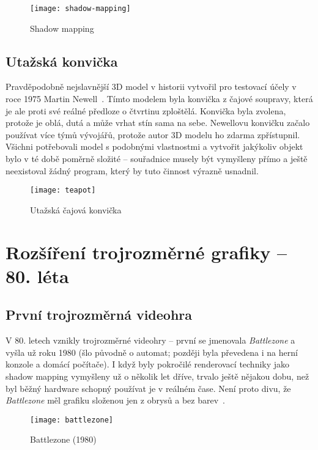 \documentclass[a4paper, 11pt]{report}
\begin{document}
\begin{chapterwithoutpagebreak}
\begin{figure}[H]
    \centering
    \texttt{[image: shadow-mapping]}
    \caption[Shadow mapping]{Shadow mapping~\cite{pic:shadow-mapping}}
\end{figure}

\section{Utažská konvička}
Pravděpodobně nejslavnější 3D model v historii vytvořil pro testovací účely v roce 1975 Martin Newell~\cite{historyoi:teapot}. Tímto modelem byla konvička z čajové soupravy, která je ale proti své reálné předloze o čtvrtinu zploštělá. Konvička byla zvolena, protože je oblá, dutá a může vrhat stín sama na sebe. Newellovu konvičku začalo používat více týmů vývojářů, protože autor 3D modelu ho zdarma zpřístupnil. Všichni potřebovali model s podobnými vlastnostmi a vytvořit jakýkoliv objekt bylo v té době poměrně složité -- souřadnice musely být vymyšleny přímo a ještě neexistoval žádný program, který by tuto činnost výrazně usnadnil.

\begin{figure}[H]
    \centering
    \texttt{[image: teapot]}
    \caption{Utažská čajová konvička}
\end{figure}
\pagebreak
\chapter{Rozšíření trojrozměrné grafiky -- 80. léta}
\section{První trojrozměrná videohra}
V 80. letech vznikly trojrozměrné videohry -- první se jmenovala \emph{Battlezone} a vyšla už roku 1980 (šlo původně o automat; později byla převedena i na herní konzole a domácí počítače). I když byly pokročilé renderovací techniky jako shadow mapping vymyšleny už o několik let dříve, trvalo ještě nějakou dobu, než byl běžný hardware schopný používat je v reálném čase. Není proto divu, že \emph{Battlezone} měl grafiku složenou jen z obrysů a bez barev~\cite{gamewiki:battlezone}.

\begin{figure}[H]
    \centering
    \texttt{[image: battlezone]}
    \caption[Battlezone (1980)]{Battlezone (1980)~\cite{pic:battlezone}}
\end{figure}


\end{chapterwithoutpagebreak}
\end{document}
